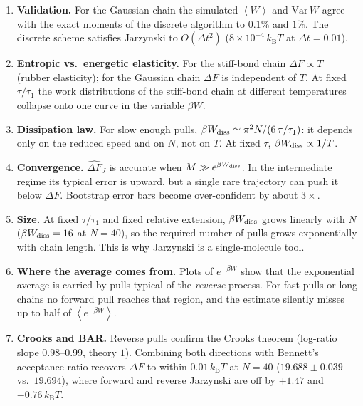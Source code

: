 \documentclass[11pt,a4paper]{article}
\newcommand{\kT}{k_{\mathrm B}T}
\newcommand{\avg}[1]{\left\langle #1\right\rangle}
\newcommand{\Wd}{W_{\rm diss}}
\newcommand{\dFJ}{\widehat{\Delta F}_J}
\begin{document}
\begin{note}
\begin{enumerate}[leftmargin=*,itemsep=2pt]
\item \textbf{Validation.} For the Gaussian chain the simulated $\avg W$ and $\mathrm{Var}\,W$
agree with the exact moments of the discrete algorithm to $0.1\%$ and $1\%$. The discrete
scheme satisfies Jarzynski to $O(\Delta t^2)$ ($8\times10^{-4}\,\kT$ at $\Delta t=0.01$).
\item \textbf{Entropic vs.\ energetic elasticity.} For the stiff-bond chain $\Delta F\propto T$
(rubber elasticity); for the Gaussian chain $\Delta F$ is independent of $T$. At fixed
$\tau/\tau_1$ the work distributions of the stiff-bond chain at different temperatures
collapse onto one curve in the variable $\beta W$.
\item \textbf{Dissipation law.} For slow enough pulls, $\beta\Wd\simeq \pi^2N/(6\,\tau/\tau_1)$:
it depends only on the reduced speed and on $N$, not on $T$. At fixed $\tau$, $\beta\Wd\propto1/T$.
\item \textbf{Convergence.} $\dFJ$ is accurate when $M\gg e^{\beta\Wd}$. In the
intermediate regime its typical error is upward, but a single rare trajectory can push it
below $\Delta F$. Bootstrap error bars become over-confident by about $3\times$.
\item \textbf{Size.} At fixed $\tau/\tau_1$ and fixed relative extension, $\beta\Wd$ grows
linearly with $N$ ($\beta\Wd=16$ at $N=40$), so the required number of pulls grows
exponentially with chain length. This is why Jarzynski is a single-molecule tool.
\item \textbf{Where the average comes from.} Plots of $e^{-\beta W}$ show that the exponential
average is carried by pulls typical of the \emph{reverse} process. For fast pulls or long chains
no forward pull reaches that region, and the estimate silently misses up to half of
$\avg{e^{-\beta W}}$.
\item \textbf{Crooks and BAR.} Reverse pulls confirm the Crooks theorem (log-ratio slope
$0.98$--$0.99$, theory $1$). Combining both directions with Bennett's acceptance ratio recovers
$\Delta F$ to within $0.01\,\kT$ at $N=40$ ($19.688\pm0.039$ vs.\ $19.694$), where forward and
reverse Jarzynski are off by $+1.47$ and $-0.76\,\kT$.
\end{enumerate}
\end{note}

\tableofcontents
\newpage

\end{document}
